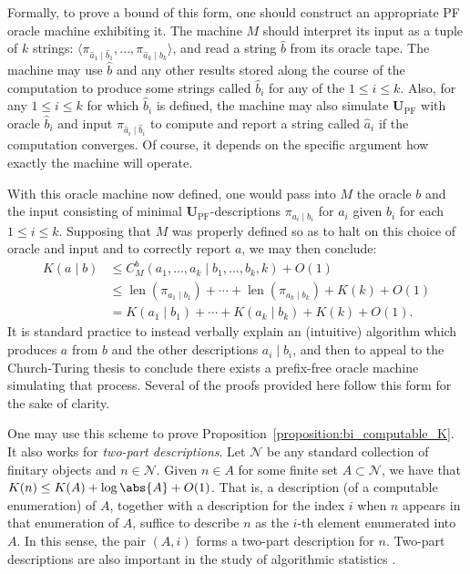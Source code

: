Formally, to prove a bound of this form, one should construct an appropriate PF oracle machine exhibiting it. The machine $M$ should interpret its input as a tuple of $k$ strings: $\langle \pi_{\widehat{a}_1 \mid \widehat{b}_1}, ..., \pi_{\widehat{a}_k \mid \widehat{b}_k} \rangle$, and read a string $\widehat{b}$ from its oracle tape. The machine may use $\widehat{b}$ and any other results stored along the course of the computation to produce some strings called $\widehat{b}_i$ for any of the $1 \leq i \leq k$. Also, for any $1 \leq i \leq k$ for which $\widehat{b}_i$ is defined, the machine may also simulate $\mathbf{U}_{\operatorname{PF}}$ with oracle $\widehat{b}_i$ and input $\pi_{\widehat{a}_i \mid \widehat{b}_i}$ to compute and report a string called $\widehat{a}_i$ if the computation converges. Of course, it depends on the specific argument how exactly the machine will operate. 

With this oracle machine now defined, one would pass into $M$ the oracle $b$ and the input consisting of minimal $\mathbf{U}_{\operatorname{PF}}$-descriptions $\pi_{a_i \mid b_i}$ for $a_i$ given $b_i$ for each $1 \leq i \leq k$. Supposing that $M$ was properly defined so as to halt on this choice of oracle and input and to correctly report $a$, we may then conclude:
\begin{align*}
    K(a \mid b) &\leq C^b_M(a_1, ..., a_k \mid b_1, ..., b_k, k) + O(1)\\
    &\leq \operatorname{len}(\pi_{a_1 \mid b_1}) + \cdots + \operatorname{len}(\pi_{a_k \mid b_k}) + K(k) + O(1)\\
    &= K(a_1 \mid b_1) + \cdots + K(a_k \mid b_k) + K(k) + O(1).
\end{align*}
It is standard practice to instead verbally explain an (intuitive) algorithm which produces $a$ from $b$ and the other descriptions $a_i \mid b_i$, and then to appeal to the Church-Turing thesis to conclude there exists a prefix-free oracle machine simulating that process. Several of the proofs provided here follow this form for the sake of clarity. 

One may use this scheme to prove Proposition~\ref{proposition:bi_computable_K}. It also works for \textit{two-part descriptions}. Let $\mathscr{N}$ be any standard collection of finitary objects and $n \in \mathscr{N}$. Given $n \in A$ for some finite set $A \subset \mathscr{N}$, we have that $K(n) \leq K(A) + \log \abs{A} + O(1)$. That is, a description (of a computable enumeration) of $A$, together with a description for the index $i$ when $n$ appears in that enumeration of $A$, suffice to describe $n$ as the $i$-th element enumerated into $A$. In this sense, the pair $(A, i)$ forms a two-part description for $n$. Two-part descriptions are also important in the study of algorithmic statistics \cite{VS16}.

